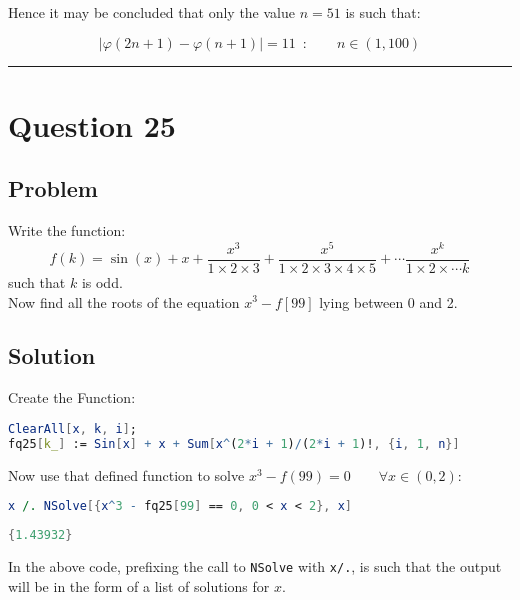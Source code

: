 \documentclass[12pt]{article}
\newenvironment{prob}[1][Problem]{%
	\sffamily \itshape   %
}{\endproof} %
\begin{document}
 Hence it may be concluded that only the value $n=51$ is such that:
 
 $$
 |\varphi\left( 2n+1 \right) - \varphi \left( n+1 \right)| = 11 \enspace :\qquad n \in \left( 1, 100 \right)
 $$

 \begin{flushright}
 {\rule{0.7em}{0.7em}}
 \end{flushright}
  
\newpage

\section{Question 25}
\subsection{Problem}
\begin{prob}
Write the function:
$$
f\left( k \right) =  \sin{\left( x \right)+  x + \frac{x^3}{1 \times 2\times 3} + \frac{x^5}{1 \times  2 \times  3 \times  4 \times 5} +  \cdots \frac{x^k}{1 \times  2 \times  \cdots k}} 
$$
such that $k$ is odd.\\

Now find all the roots of the equation $x^3-f\left[ 99 \right]$ lying between 0 and 2.
\end{prob}

\subsection{Solution}
Create the Function:
\begin{lstlisting}[language = Mathematica]
ClearAll[x, k, i]; 
fq25[k_] := Sin[x] + x + Sum[x^(2*i + 1)/(2*i + 1)!, {i, 1, n}]
\end{lstlisting}	

Now use that defined function to solve $x^3 - f\left( 99 \right) = 0 \qquad \forall x \in \left( 0,2 \right)$:

\begin{lstlisting}[language = Mathematica]
x /. NSolve[{x^3 - fq25[99] == 0, 0 < x < 2}, x]   
\end{lstlisting}	

\begin{lstlisting}[language = Mathematica]
{1.43932}
\end{lstlisting}	

In the above code, prefixing the call to \verb|NSolve|  with \verb|x/.|, is such that the output will be in the form of a list of solutions for $x$.\\
\end{document}
